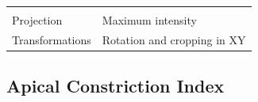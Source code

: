 \documentclass[11pt,singlespacinge,twoside]{reedthesis} %
\begin{document}
\begin{longtable}[]{@{}ll@{}}
\begin{minipage}[t]{0.21\columnwidth}
\end{minipage} & \begin{minipage}[t]{0.73\columnwidth}\raggedright
\strut
\end{minipage}\tabularnewline
\begin{minipage}[t]{0.21\columnwidth}\raggedright
Projection\strut
\end{minipage} & \begin{minipage}[t]{0.73\columnwidth}\raggedright
Maximum intensity\strut
\end{minipage}\tabularnewline
\begin{minipage}[t]{0.21\columnwidth}\raggedright
Transformations\strut
\end{minipage} & \begin{minipage}[t]{0.73\columnwidth}\raggedright
Rotation and cropping in XY\strut
\end{minipage}\tabularnewline
\bottomrule
\end{longtable}
\hypertarget{aci-data}{%
\subsection{Apical Constriction Index}\label{aci-data}}
\end{document}
